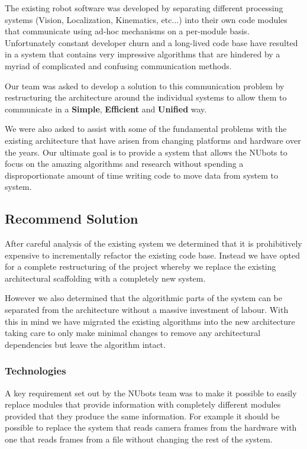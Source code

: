 \documentclass[english,12pt]{scrartcl}
\begin{document}
			The existing robot software was developed by separating different processing systems (Vision, Localization, Kinematics, etc...) into their own code modules that communicate using ad-hoc mechanisms on a per-module basis. 
			Unfortunately constant developer churn and a long-lived code base have resulted in a system that contains very impressive algorithms that are hindered by a myriad of complicated and confusing communication methods.
			
			Our team was asked to develop a solution to this communication problem by restructuring the architecture around the individual systems to allow them to communicate in a \textbf{Simple}, \textbf{Efficient} and \textbf{Unified} way. 
			
			We were also asked to assist with some of the fundamental problems with the existing architecture that have arisen from changing platforms and hardware over the years. 
			Our ultimate goal is to provide a system that allows the NUbots to focus on the amazing algorithms and research without spending a disproportionate amount of time writing code to move data from system to system.
				
		\subsection{Recommend Solution}
			After careful analysis of the existing system we determined that it is prohibitively expensive to incrementally refactor the existing code base. 
			Instead we have opted for a complete restructuring of the project whereby we replace the existing architectural scaffolding with a completely new system.
			
			However we also determined that the algorithmic parts of the system can be separated from the architecture without a massive investment of labour. 
			With this in mind we have migrated the existing algorithms into the new architecture taking care to only make minimal changes to remove any architectural dependencies but leave the algorithm intact.
			
			\subsubsection{Technologies}
				A key requirement set out by the NUbots team was to make it possible to easily replace modules that provide information with completely different modules provided that they produce the same information. 
				For example it should be possible to replace the system that reads camera frames from the hardware with one that reads frames from a file without changing the rest of the system.
				
\end{document}
